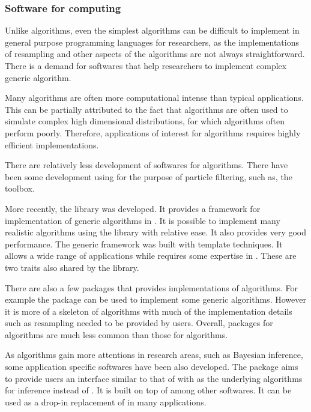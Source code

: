 \subsubsection{Software for \protect\smc computing}
\label{ssub:Softwares for smc computing}

Unlike \mcmc algorithms, even the simplest \smc algorithms can be difficult to implement in general purpose programming languages for researchers, as the implementations of resampling and other aspects of the algorithms are not always straightforward. There is a demand for softwares that help researchers to implement complex generic \smc algorithm.

Many \smc algorithms are often more computational intense than typical \mcmc applications. This can be partially attributed to the fact that \smc algorithms are often used to simulate complex high dimensional distributions, for which \mcmc algorithms often perform poorly. Therefore, applications of interest for \smc algorithms requires highly efficient implementations.

There are relatively less development of softwares for \smc algorithms. There have been some development using \matlab for the purpose of particle filtering, such as, the \pflib \cite{pflib} toolbox.

More recently, the \smctc library \cite{smctc} was developed. It provides a framework for implementation of generic \smc algorithms in \cpp. It is possible to implement many realistic algorithms using the library with relative ease. It also provides very good performance. The generic framework was built with \cpp template techniques. It allows a wide range of applications while requires some expertise in \cpp. These are two traits also shared by the \vsmc library.

There are also a few \rlang packages that provides implementations of \smc algorithms. For example the \rsmc \cite{rsmc} package can be used to implement some generic \smc algorithms. However it is more of a skeleton of \smc algorithms with much of the implementation details such as resampling needed to be provided by users. Overall, \rlang packages for \smc algorithms are much less common than those for \mcmc algorithms.

As \smc algorithms gain more attentions in research areas, such as Bayesian inference, some application specific softwares have been also developed. The \biips \cite{biips} package aims to provide users an interface similar to that of \bugs with \smc as the underlying algorithms for inference instead of \mcmc. It is built on top of \smctc among other softwares. It can be used as a drop-in replacement of \bugs in many applications.

